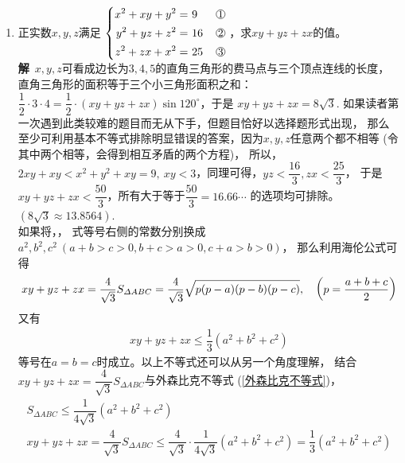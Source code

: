 \begin{enumerate}[label={【\textbf{例\thechapter.\arabic*}】},
 leftmargin=\inteval{\myenumleftmargin}pt,
 itemsep=\inteval{\myenumitempsep}pt,
 itemindent=\inteval{\myenumitemindent}pt]
\item 正实数$ x,y,z $满足
$ \left\{ \begin{aligned} x^2+xy+y^2 =&\ 9  &\mycircled{1} \\
    y^2+yz+z^2=&\ 16 &\mycircled{2} \\
    z^2+zx+x^2=&\ 25 &\mycircled{3} \end{aligned} \right. $，求$ xy+yz+zx $的值。\\
\textbf{解}\ $ x,y,z $可看成边长为$ 3,4,5 $的直角三角形的费马点与三个顶点连线的长度，
直角三角形的面积等于三个小三角形面积之和：$ \dfrac{1}{2}\cdot 3\cdot 4= \dfrac{1}{2}\cdot(xy+yz+zx)\sin 120^{\circ} $，于是
$ xy+yz+zx=8\sqrt{3} $. 如果读者第一次遇到此类较难的题目而无从下手，但题目恰好以选择题形式出现，
那么至少可利用基本不等式排除明显错误的答案，因为$ x,y,z $任意两个都不相等
(令其中两个相等，会得到相互矛盾的两个方程)，
所以，$ 2xy+xy < x^2+y^2+xy =9,\ xy <3$，同理可得，$ yz<\dfrac{16}{3},zx<\dfrac{25}{3} $，
于是$ xy+yz+zx < \dfrac{50}{3} $，所有大于等于$ \dfrac{50}{3}=16.66\cdots $
的选项均可排除。$ (8\sqrt{3}\approx 13.8564 ) $. \\
如果将，，
式等号右侧的常数分别换成$ a^2,b^2,c^2\ 
(a+b>c>0,b+c>a>0,c+a>b>0) $，
那么利用海伦公式可得
\begin{gather*}
    xy+yz+zx=
    \dfrac{4}{\sqrt{3}}S_{\Delta ABC}=
    \dfrac{4}{\sqrt{3}}\sqrt{p(p-a)(p-b)(p-c)}, \quad 
    \left(p=\dfrac{a+b+c}{2} \right)
\end{gather*}
又有
\begin{gather*}
    xy+yz+zx\leq \dfrac{1}{3}(a^2+b^2+c^2)
\end{gather*}
等号在$ a=b=c $时成立。以上不等式还可以从另一个角度理解，
结合$ xy+yz+zx=\dfrac{4}{\sqrt{3}}S_{\Delta ABC} $与外森比克不等式
(\ref{外森比克不等式})，
\begin{gather*}
    S_{\Delta ABC}\leq \dfrac{1}{4\sqrt{3}}(a^2+b^2+c^2) \\
    xy+yz+zx=\dfrac{4}{\sqrt{3}}S_{\Delta ABC}\leq 
    \dfrac{4}{\sqrt{3}}\cdot \dfrac{1}{4\sqrt{3}}(a^2+b^2+c^2)=
    \dfrac{1}{3}(a^2+b^2+c^2)
\end{gather*}


\end{enumerate}
